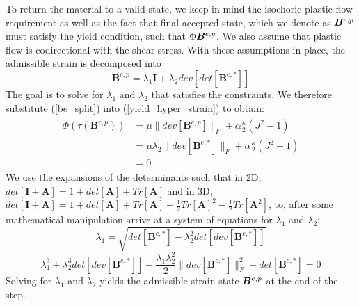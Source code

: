 To return the material to a valid state, we keep in mind the isochoric plastic flow requirement as well as the fact that final accepted state, which we denote as $\b_p$ must satisfy the yield condition, such that $\Phi{\b_p}$. We also assume that plastic flow is codirectional with the shear stress. With these assumptions in place, the admissible strain is decomposed into
\begin{equation}
\bm{B}^{e,p}=\lambda_1\bm{I}+\lambda_2 dev[det[\bm{B}^{e,*}]] \label{be_split}
\end{equation}
The goal is to solve for $\lambda_1$ and $\lambda_2$ that satisfies the constraints. We therefore substitute (\ref{be_split}) into (\ref{yield_hyper_strain}) to obtain:
\begin{align}
\begin{aligned}
  \Phi\left( \tau \left( \bm{B}^{e,p} \right) \right) &= \mu \| dev[\bm{B}^{e,p}] \|_F + \alpha \frac{\kappa}{2} ( J^2 - 1 ) \\
                                                             &= \mu \lambda_2 \| dev[\bm{B}^{e,*}] \|_F + \alpha \frac{\kappa}{2} ( J^2 - 1 ) \\
&= 0
\end{aligned}
\end{align}
We use the expansions of the determinants such that in 2D, $det[\bm{I} + \bm{A}] = 1 + det[\bm{A}] + Tr[\bm{A}]$ and in 3D, $det[\bm{I} + \bm{A}] = 1 + det[\bm{A}] + Tr[\bm{A}] + \frac{1}{2}Tr[\bm{A}]^2 - \frac{1}{2}Tr[\bm{A}^2]$, to, after some mathematical manipulation arrive at a system of equations for $\lambda_1$ and $\lambda_2$:
\begin{equation}
\lambda_1 = \sqrt{det[\bm{B}^{e,*}] - \lambda_2^2 det[ dev[\bm{B}^{e,*}]]}
\end{equation}
\begin{equation}
\lambda^3_1 + \lambda^3_2 det[dev[\bm{B}^{e,*}]] - \frac{\lambda_1 \lambda^2_2}{2} \|dev[\bm{B}^{e,*}]\|^2_F - det[\bm{B}^{e,*}] = 0
\end{equation}
Solving for $\lambda_1$ and $\lambda_2$ yields the admissible strain state $\b_p$ at the end of the step.

